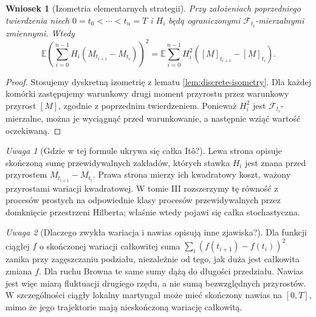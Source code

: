 \documentclass[11pt,a4paper,oneside]{report}
\numberwithin{equation}{chapter}
\theoremstyle{plain}
\newtheorem{wniosek}[twierdzenie]{Wniosek}
\theoremstyle{definition}
\theoremstyle{remark}
\newtheorem{uwaga}{Uwaga}[chapter]
\newcommand{\E}{\mathbb{E}}
\newcommand{\calF}{\mathcal{F}}
\begin{document}
\begin{wniosek}[Izometria elementarnych strategii]
Przy założeniach poprzedniego twierdzenia niech
$0=t_0<\cdots<t_n=T$ i $H_i$ będą ograniczonymi
$\calF_{t_i}$-mierzalnymi zmiennymi. Wtedy
\[
\E\left(\sum_{i=0}^{n-1}H_i(M_{t_{i+1}}-M_{t_i})\right)^2
=\E\sum_{i=0}^{n-1}H_i^2
([M]_{t_{i+1}}-[M]_{t_i}).
\]
\end{wniosek}
\begin{proof}
Stosujemy dyskretną izometrię z lematu
\ref{lem:discrete-isometry}. Dla każdej komórki
zastępujemy warunkowy drugi moment przyrostu przez
warunkowy przyrost $[M]$, zgodnie z poprzednim
twierdzeniem. Ponieważ $H_i^2$ jest
$\calF_{t_i}$-mierzalne, można je wyciągnąć przed
warunkowanie, a następnie wziąć wartość oczekiwaną.
\end{proof}

\begin{uwaga}[Gdzie w tej formule ukrywa się całka Itô?]
Lewa strona opisuje skończoną sumę przewidywalnych
zakładów, których stawka $H_i$ jest znana przed
przyrostem $M_{t_{i+1}}-M_{t_i}$. Prawa strona
mierzy ich kwadratowy koszt, ważony przyrostami
wariacji kwadratowej. W tomie III rozszerzymy tę
równość z procesów prostych na odpowiednie klasy
procesów przewidywalnych przez domknięcie przestrzeni
Hilberta; właśnie wtedy pojawi się całka stochastyczna.
\end{uwaga}

\begin{uwaga}[Dlaczego zwykła wariacja i nawias opisują inne zjawiska?]
Dla funkcji ciągłej $f$ o skończonej wariacji całkowitej
suma $\sum_i(f(t_{i+1})-f(t_i))^2$ zanika przy
zagęszczaniu podziału, niezależnie od tego, jak duża
jest całkowita zmiana $f$. Dla ruchu Browna te same
sumy dążą do długości przedziału. Nawias jest więc
miarą fluktuacji drugiego rzędu, a nie sumą bezwzględnych
przyrostów. W szczególności ciągły lokalny martyngał
może mieć skończony nawias na $[0,T]$, mimo że jego
trajektorie mają nieskończoną wariację całkowitą.
\end{uwaga}
\end{document}
